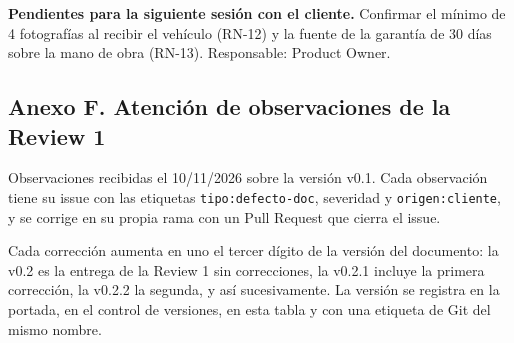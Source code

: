 \textbf{Pendientes para la siguiente sesión con el cliente.} Confirmar el
mínimo de 4 fotografías al recibir el vehículo (RN-12) y la fuente de la
garantía de 30 días sobre la mano de obra (RN-13). Responsable: Product
Owner.

\subsection{Anexo F. Atención de observaciones de la Review 1}\label{anexo-f}

Observaciones recibidas el 10/11/2026 sobre la versión v0.1. Cada
observación tiene su issue con las etiquetas \texttt{tipo:defecto-doc},
severidad y \texttt{origen:cliente}, y se corrige en su propia rama con
un Pull Request que cierra el issue.

Cada corrección aumenta en uno el tercer dígito de la versión del
documento: la v0.2 es la entrega de la Review 1 sin correcciones, la
v0.2.1 incluye la primera corrección, la v0.2.2 la segunda, y así
sucesivamente. La versión se registra en la portada, en el control de
versiones, en esta tabla y con una etiqueta de Git del mismo nombre.

